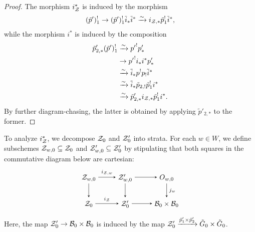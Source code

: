 \documentclass[a4paper,10pt,leqno]{amsart}
\theoremstyle{plain}
\theoremstyle{plain}
\theoremstyle{plain}
\theoremstyle{definition}
\theoremstyle{remark}
\begin{document}
\begin{proof}
The morphism $i_\cal{Z}^\ast$ is induced by the morphism 
\begin{align}
(\tilde{p}')_1^! \to (\tilde{p}')_1^! \tilde{i}_\ast \tilde{i}^\ast
\xrightarrow{\sim} i_{\cal{Z}, \ast} {\tilde{p}}_1^! \tilde{i}^\ast,
\end{align}
while the morphism $i^\ast$ is induced by the composition
\begin{align}\begin{split}
\tilde{p}'_{2, \ast} (\tilde{p}')_1^! 
&\xrightarrow{\sim} {p'}^! p'_\ast \\
&\to {p'}^! i_\ast i^\ast p'_\ast\\
&\xrightarrow{\sim} \tilde{i}_\ast p^! p_! \tilde{i}^\ast\\
&\xrightarrow{\sim} \tilde{i}_\ast \tilde{p}_{2, !} \tilde{p}_1^! i^\ast\\
&\xrightarrow{\sim} \tilde{p}'_{2, \ast} i_{\cal{Z}, \ast} \tilde{p}_1^! i^\ast.
\end{split}\end{align}
By further diagram-chasing, the latter is obtained by applying $\tilde{p}'_{2, \ast}$ to the former.
\end{proof}

To analyze $i_\cal{Z}^\ast$, we decompose $\cal{Z}_0$ and $\cal{Z}'_0$ into strata.
For each $w \in W$, we define subschemes $\cal{Z}_{w, 0} \subseteq \cal{Z}_0$ and $\cal{Z}'_{w, 0} \subseteq \cal{Z}'_0$ by stipulating that both squares in the commutative diagram below are cartesian:
\begin{equation}\label{eq:z-w}
\begin{tikzpicture}[baseline=(current bounding box.center), >=stealth]
\matrix(m)[matrix of math nodes, row sep=2em, column sep=2.5em, text height=2ex, text depth=0.5ex]
{	\cal{Z}_{w, 0}
		&\cal{Z}'_{w, 0}
		&O_{w, 0}\\
	\cal{Z}_0
		&\cal{Z}'_0
		&\cal{B}_0 \times \cal{B}_0\\
		};
\path[->,font=\scriptsize, auto]
(m-1-1)		edge node{$i_{\cal{Z}, w}$} (m-1-2)
(m-1-1)		edge (m-2-1)
(m-1-2)		edge (m-1-3)
(m-1-2)		edge (m-2-2)
(m-2-1)		edge node{$i_\cal{Z}$} (m-2-2)
(m-2-2)		edge (m-2-3)
(m-1-3)		edge node{$j_w$} (m-2-3);
\end{tikzpicture}
\end{equation}
Here, the map $\cal{Z}'_0 \to \cal{B}_0 \times \cal{B}_0$ is induced by the map $\cal{Z}'_0 \xrightarrow{\tilde{p}'_1 \times \tilde{p}'_2} \tilde{G}_0 \times \tilde{G}_0$.
\end{document}
